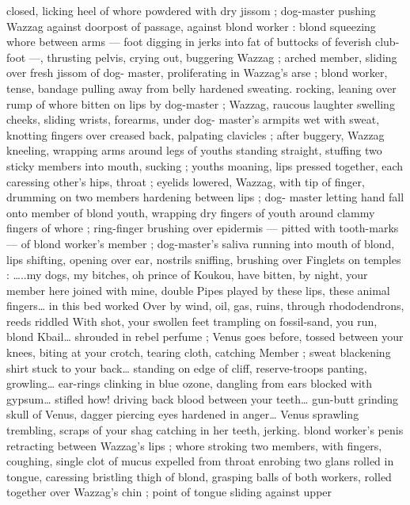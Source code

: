 closed, licking heel of whore powdered with dry jissom ; dog-master 
pushing Wazzag against doorpost of passage, against blond worker 
: blond squeezing whore between arms --- foot digging in jerks into 
fat of buttocks of feverish club-foot ---, thrusting pelvis, crying out, 
buggering Wazzag ; arched member, sliding over fresh jissom of dog- 
master, proliferating in Wazzag's arse ; blond worker, tense, bandage 
pulling away from belly hardened sweating. rocking, leaning over 
rump of whore bitten on lips by dog-master ; Wazzag, raucous 
laughter swelling cheeks, sliding wrists, forearms, under dog- 
master's armpits wet with sweat, knotting fingers over creased back, 
palpating clavicles ; after buggery, Wazzag kneeling, wrapping arms 
around legs of youths standing straight, stuffing two sticky members 
into mouth, sucking ; youths moaning, lips pressed together, each 
caressing other's hips, throat ; eyelids lowered, Wazzag, with tip of 
finger, drumming on two members hardening between lips ; dog- 
master letting hand fall onto member of blond youth, wrapping dry 
fingers of youth around clammy fingers of whore ; ring-finger 
brushing over epidermis --- pitted with tooth-marks --- of blond 
worker's member ; dog-master's saliva running into mouth of blond, 
lips shifting, opening over ear, nostrils sniffing, brushing over 
Finglets on temples : {\gl}{\ldots}..my dogs, my bitches, oh prince of Koukou, 
have bitten, by night, your member here joined with mine, double 
Pipes played by these lips, these animal fingers{\ldots} in this bed worked 
Over by wind, oil, gas, ruins, through rhododendrons, reeds riddled 
With shot, your swollen feet trampling on fossil-sand, you run, blond 
Kbail{\ldots} shrouded in rebel perfume ; Venus goes before, tossed 
between your knees, biting at your crotch, tearing cloth, catching 
Member ; sweat blackening shirt stuck to your back{\ldots} standing on 
edge of cliff, reserve-troops panting, growling{\ldots} ear-rings clinking in 
blue ozone, dangling from ears blocked with gypsum{\ldots} stifled how! 
driving back blood between your teeth{\ldots} gun-butt grinding skull of 
Venus, dagger piercing eyes hardened in anger{\ldots} Venus sprawling 
trembling, scraps of your shag catching in her teeth, jerking.{\gr} 
blond worker's penis retracting between Wazzag's lips ; whore 
stroking two members, with fingers, coughing, single clot of mucus 
expelled from throat enrobing two glans rolled in tongue, caressing 
bristling thigh of blond, grasping balls of both workers, rolled 
together over Wazzag's chin ; point of tongue sliding against upper 
